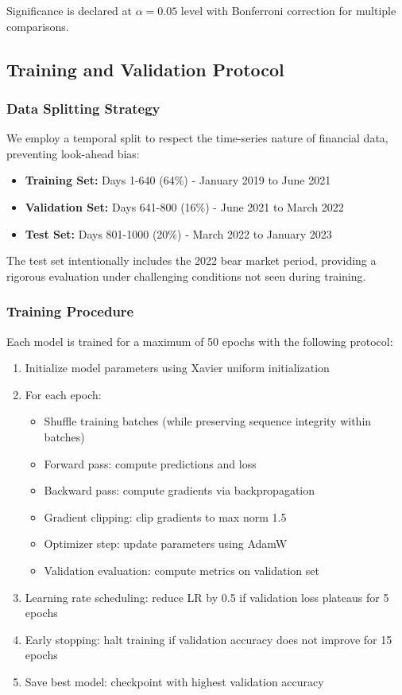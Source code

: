 \documentclass[conference]{IEEEtran}
\begin{document}
Significance is declared at $\alpha = 0.05$ level with Bonferroni correction for multiple comparisons.

\subsection{Training and Validation Protocol}

\subsubsection{Data Splitting Strategy}
We employ a temporal split to respect the time-series nature of financial data, preventing look-ahead bias:

\begin{itemize}
\item \textbf{Training Set:} Days 1-640 (64\%) - January 2019 to June 2021
\item \textbf{Validation Set:} Days 641-800 (16\%) - June 2021 to March 2022
\item \textbf{Test Set:} Days 801-1000 (20\%) - March 2022 to January 2023
\end{itemize}

The test set intentionally includes the 2022 bear market period, providing a rigorous evaluation under challenging conditions not seen during training.

\subsubsection{Training Procedure}
Each model is trained for a maximum of 50 epochs with the following protocol:

\begin{enumerate}
\item Initialize model parameters using Xavier uniform initialization
\item For each epoch:
    \begin{itemize}
    \item Shuffle training batches (while preserving sequence integrity within batches)
    \item Forward pass: compute predictions and loss
    \item Backward pass: compute gradients via backpropagation
    \item Gradient clipping: clip gradients to max norm 1.5
    \item Optimizer step: update parameters using AdamW
    \item Validation evaluation: compute metrics on validation set
    \end{itemize}
\item Learning rate scheduling: reduce LR by 0.5 if validation loss plateaus for 5 epochs
\item Early stopping: halt training if validation accuracy does not improve for 15 epochs
\item Save best model: checkpoint with highest validation accuracy
\end{enumerate}
\end{document}

